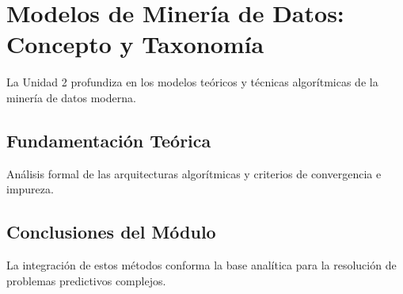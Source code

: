 \section{Modelos de Minería de Datos: Concepto y Taxonomía}
\label{sec:u2_modelos_mineria_datos}
La Unidad 2 profundiza en los modelos teóricos y técnicas algorítmicas de la minería de datos moderna.
\subsection{Fundamentación Teórica}
Análisis formal de las arquitecturas algorítmicas y criterios de convergencia e impureza.

\subsection{Conclusiones del Módulo}
La integración de estos métodos conforma la base analítica para la resolución de problemas predictivos complejos.
